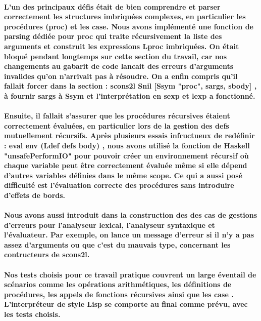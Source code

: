 \documentclass{article}
\begin{document}
\paragraph{L'un des principaux défis était de bien comprendre et parser correctement les structures imbriquées complexes, en particulier les procédures (proc) 
et les case. Nous avons implémenté une fonction de parsing dédiée pour proc qui traite récursivement la liste des arguments et construit les expressions Lproc imbriquées. On était bloqué pendant longtemps sur cette section du travail, car nos changements au gabarit de code lancait des erreurs d'arguments invalides qu'on n'arrivait pas à résoudre. On a enfin compris qu'il fallait forcer dans la section : scons2l Snil [Ssym "proc", sargs, sbody] , à fournir sargs à Ssym et l'interprétation en sexp et lexp a fonctionné.  }

\paragraph{Ensuite, il fallait s'assurer que les procédures récursives étaient correctement évaluées, en particulier lors de la gestion des defs mutuellement récursifs. Après plusieurs essais infructueux de redéfinir : eval env (Ldef defs body) , nous avons utilisé la fonction de Haskell "unsafePerformIO" pour pouvoir créer un environnement récursif où chaque variable peut être correctement évaluée même si elle dépend d'autres variables définies dans le même scope. Ce qui a aussi posé difficulté est l'évaluation correcte des procédures sans introduire d'effets de bords. }

\paragraph{Nous avons aussi introduit dans la construction des des cas de gestions d'erreurs pour l'analyseur lexical, l'analyseur syntaxique et l'évaluateur. Par exemple, on lance un message d'erreur si il n'y a pas assez d'arguments ou que c'est du mauvais type, concernant les contructeurs de scons2l.}

\paragraph{Nos tests choisis pour ce travail pratique couvrent un large éventail de scénarios  comme les opérations arithmétiques, les définitions de procédures, les appels de fonctions récursives ainsi que les case . L'interpréteur de style Lisp se comporte au final comme prévu, avec les tests choisis.}
\end{document}
